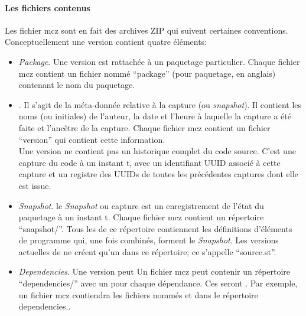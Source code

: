 \documentclass[a4paper,10pt,twoside]{book}
\begin{document}
\paragraph{Les fichiers contenus}%

Les fichier mcz sont en fait des archives ZIP qui suivent certaines
conventions.
Conceptuellement une version contient quatre éléments:

\begin{itemize}
\item \emph{Package}. Une version est rattachée à un paquetage
  particulier. Chaque fichier mcz contient un fichier nommé
  ``package'' (pour paquetage, en anglais) contenant le nom du
  paquetage.
\item \emph{}. %
Il s'agit de la méta-donnée relative à la capture (ou
\emph{snapshot}). Il contient les noms (ou initiales) de l'auteur, la
date et l'heure à laquelle la capture a été faite et l'ancêtre de la
capture.
Chaque fichier mcz contient un fichier ``version'' qui contient cette
information.\\
Une version ne contient pas un historique complet du code
source. C'est une capture du code à un instant t, avec un identifiant
UUID associé à cette capture et un registre des UUIDs de toutes les
précédentes captures dont elle est issue.
\item \emph{Snapshot}. le \emph{Snapshot} ou capture est un
  enregistrement de l'état du paquetage à un instant t.
Chaque fichier mcz contient un répertoire
  ``snapshot/''. Tous les  de ce répertoire
  contiennent les %
  définitions d'éléments de programme qui, une fois combinés, forment
  le \emph{Snapshot}. Les versions actuelles de \MC ne créent qu'un
   dans ce répertoire; ce  s'appelle
``source.st''.
\item \emph{Dependencies}. Une version peut  Un fichier mcz peut contenir un
répertoire ``dependencies/'' avec un 
pour chaque dépendance. Ces  seront . Par exemple, un
fichier mcz  contiendra les fichiers nommés
 et  dans le répertoire dependencies..
\end{itemize} %
\end{document}

